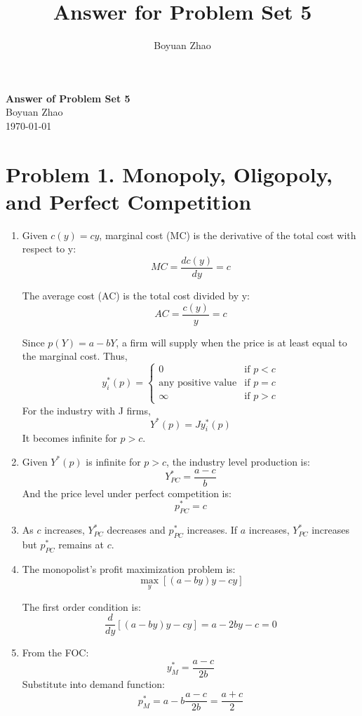 \documentclass[UTF8,titlepage]{article}
\title{Answer for Problem Set 5}
\author{Boyuan Zhao}
\numberwithin{figure}{section}
\begin{document}
\begin{center}
    {\LARGE \textbf{Answer of Problem Set 5}}\\  %
    {\normalsize Boyuan Zhao}\\  %
    {\small \today}  %
\end{center}

\section{Problem 1. Monopoly, Oligopoly, and Perfect Competition}
\begin{enumerate}
\item Given \( c(y) = c y \), marginal cost (MC) is the derivative of the total cost with respect to y:
\[ MC = \frac{dc(y)}{dy} = c \]

The average cost (AC) is the total cost divided by y:
\[ AC = \frac{c(y)}{y} = c \]

Since \( p(Y) = a - b Y \), a firm will supply when the price is at least equal to the marginal cost. Thus, 
\[ y_i^*(p) = 
\begin{cases} 
0 & \text{if } p < c \\
\text{any positive value} & \text{if } p = c \\
\infty & \text{if } p > c 
\end{cases}
\]
For the industry with J firms,
\[ Y^*(p) = J y_i^*(p) \]
It becomes infinite for \( p > c \).

\item Given \( Y^*(p) \) is infinite for \( p > c \), the industry level production is:
\[ Y_{PC}^* = \frac{a - c}{b} \]
And the price level under perfect competition is:
\[ p_{PC}^* = c \]

\item As \( c \) increases, \( Y_{PC}^* \) decreases and \( p_{PC}^* \) increases. If \( a \) increases, \( Y_{PC}^* \) increases but \( p_{PC}^* \) remains at \( c \).

\item The monopolist's profit maximization problem is:
\[ \max_{y} \left[ (a - b y)y - c y \right] \]

The first order condition is:
\[ \frac{d}{dy} [(a - by)y - cy] = a - 2by - c = 0 \]

\item From the FOC:
\[ y_M^* = \frac{a - c}{2b} \]
Substitute into demand function:
\[ p_M^* = a - b \frac{a - c}{2b} = \frac{a + c}{2} \]


\end{enumerate}
\end{document}
